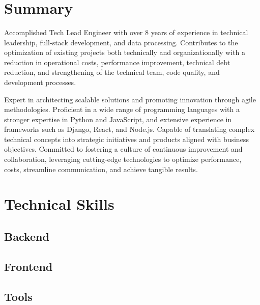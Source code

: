 \documentclass[11pt,a4paper,sans]{moderncv}
\title{\textnormal{\textls[150]{TECHLEAD ENGINEER}}} %
\begin{document}
\makecvtitle

\section{Summary}
Accomplished Tech Lead Engineer with over 8 years of experience in technical leadership, full-stack development, and data processing. Contributes to the optimization of existing projects 
both technically and organizationally with a reduction in operational costs, performance improvement, technical debt reduction, 
and strengthening of the technical team, code quality, and development processes.\\

\vspace{0.1cm}

Expert in architecting scalable solutions and promoting innovation through agile methodologies. Proficient in a wide range of programming languages with a stronger expertise in Python and JavaScript, 
and extensive experience in frameworks such as Django, React, and Node.js. Capable of translating complex technical concepts into strategic initiatives and products 
aligned with business objectives. Committed to fostering a culture of continuous improvement and collaboration, 
leveraging cutting-edge technologies to optimize performance, costs, streamline communication, and achieve tangible results.

\section{Technical Skills}
\subsection{Backend}

\subsection{Frontend}

\subsection{Tools}
\end{document}
